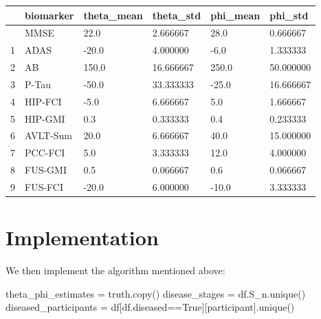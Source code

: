 \documentclass[
  letterpaper,
  DIV=11,
  numbers=noendperiod]{scrreprt}
\newenvironment{Shaded}{\begin{snugshade}}{\end{snugshade}}
\newcommand{\NormalTok}[1]{\textcolor[rgb]{0.00,0.23,0.31}{#1}}
\newcommand{\OperatorTok}[1]{\textcolor[rgb]{0.37,0.37,0.37}{#1}}
\newcommand{\StringTok}[1]{\textcolor[rgb]{0.13,0.47,0.30}{#1}}
\newcommand{\VariableTok}[1]{\textcolor[rgb]{0.07,0.07,0.07}{#1}}
\begin{document}
\begin{longtable}[]{@{}llllll@{}}
\toprule\noalign{}
& biomarker & theta\_mean & theta\_std & phi\_mean & phi\_std \\
\midrule\noalign{}
\endhead
\bottomrule\noalign{}
\endlastfoot
0 & MMSE & 22.0 & 2.666667 & 28.0 & 0.666667 \\
1 & ADAS & -20.0 & 4.000000 & -6.0 & 1.333333 \\
2 & AB & 150.0 & 16.666667 & 250.0 & 50.000000 \\
3 & P-Tau & -50.0 & 33.333333 & -25.0 & 16.666667 \\
4 & HIP-FCI & -5.0 & 6.666667 & 5.0 & 1.666667 \\
5 & HIP-GMI & 0.3 & 0.333333 & 0.4 & 0.233333 \\
6 & AVLT-Sum & 20.0 & 6.666667 & 40.0 & 15.000000 \\
7 & PCC-FCI & 5.0 & 3.333333 & 12.0 & 4.000000 \\
8 & FUS-GMI & 0.5 & 0.066667 & 0.6 & 0.066667 \\
9 & FUS-FCI & -20.0 & 6.000000 & -10.0 & 3.333333 \\
\end{longtable}

\section{Implementation}\label{implementation}

We then implement the algorithm mentioned above:

\begin{Shaded}
\begin{Highlighting}[]
\NormalTok{theta\_phi\_estimates }\OperatorTok{=}\NormalTok{ truth.copy()}
\NormalTok{disease\_stages }\OperatorTok{=}\NormalTok{ df.S\_n.unique()}
\NormalTok{diseased\_participants }\OperatorTok{=}\NormalTok{ df[df.diseased}\OperatorTok{==}\VariableTok{True}\NormalTok{][}\StringTok{\textquotesingle{}participant\textquotesingle{}}\NormalTok{].unique()}
\end{Highlighting}
\end{Shaded}
\end{document}
